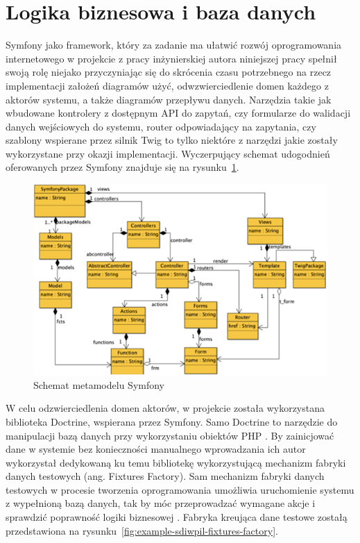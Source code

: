\documentclass[12pt,twoside]{book}
\newcommand{\captionvspace}{\vspace{6pt}}
\begin{document}
    \section{Logika biznesowa i baza danych}

    Symfony jako framework, który za zadanie ma ułatwić rozwój oprogramowania internetowego w projekcie z pracy inżynierskiej autora niniejszej pracy spełnił swoją rolę niejako przyczyniając się do skrócenia czasu potrzebnego na rzecz implementacji założeń diagramów użyć, odwzwierciedlenie domen każdego z aktorów systemu, a także diagramów przepływu danych. Narzędzia takie jak wbudowane kontrolery z dostępnym API do zapytań, czy formularze do walidacji danych wejściowych do systemu, router odpowiadający na zapytania, czy szablony wspierane przez silnik Twig to tylko niektóre z narzędzi jakie zostały wykorzystane przy okazji implementacji. Wyczerpujący schemat udogodnień oferowanych przez Symfony znajduje się na rysunku~\ref{fig:symfony-metadata-scheme}.

    \begin{figure}[ht]
        \centering
        \includegraphics[width=\textwidth]{includes/images/symfony-metadata-scheme.png}
        \captionvspace
        \caption{Schemat metamodelu Symfony \cite{mod.driv.arch.symf}}
        \label{fig:symfony-metadata-scheme}
    \end{figure}

    W celu odzwierciedlenia domen aktorów, w projekcie została wykorzystana biblioteka Doctrine, wspierana przez Symfony. Samo Doctrine to narzędzie do manipulacji bazą danych przy wykorzystaniu obiektów PHP \cite{symf.5}. By zainicjować dane w systemie bez konieczności manualnego wprowadzania ich autor wykorzystał dedykowaną ku temu bibliotekę wykorzystującą mechanizm fabryki danych testowych (ang. Fixtures Factory). Sam mechanizm fabryki danych testowych w procesie tworzenia oprogramowania umożliwia uruchomienie systemu z wypełnioną bazą danych, tak by móc przeprowadzać wymagane akcje i sprawdzić poprawność logiki biznesowej \cite{fixtures}. Fabryka kreująca dane testowe zostałą przedstawiona na rysunku~\ref{fig:example-sdiwpil-fixtures-factory}.
\end{document}

